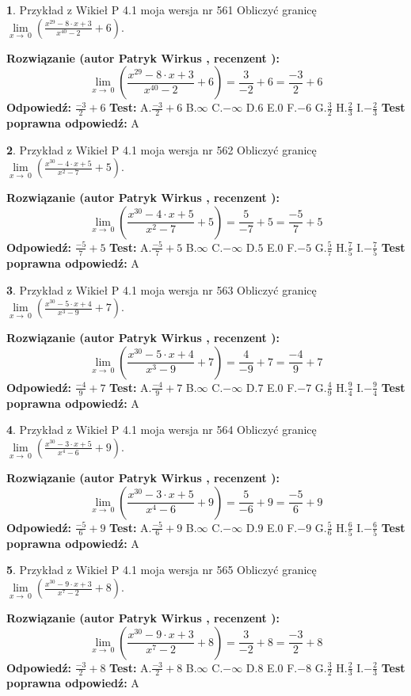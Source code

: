 \documentclass[12pt, a4paper]{article}
\theoremstyle{definition} %
\newtheorem{zad}{}
\newcommand{\zadStart}[1]{\begin{zad}#1\newline}
\newcommand{\zadStop}{\end{zad}}
\newcommand{\rozwStart}[2]{\noindent \textbf{Rozwiązanie (autor #1 , recenzent #2): }\newline}
\newcommand{\rozwStop}{\newline}
\newcommand{\odpStart}{\noindent \textbf{Odpowiedź:}\newline}
\newcommand{\odpStop}{\newline}
\newcommand{\testStart}{\noindent \textbf{Test:}\newline}
\newcommand{\testStop}{\newline}
\newcommand{\kluczStart}{\noindent \textbf{Test poprawna odpowiedź:}\newline}
\newcommand{\kluczStop}{\newline}
\begin{document}
\zadStart{Przykład z Wikieł P 4.1 moja wersja nr 561}
Obliczyć granicę $\lim\limits_{x\to\ 0}(\frac{x^{29}-8 \cdot x +3}{x^{40}-2}+6)$.
\zadStop
\rozwStart{Patryk Wirkus}{}
$$\lim\limits_{x\to\ 0}(\frac{x^{29}-8 \cdot x +3}{x^{40}-2}+6)=\frac{3}{-2}+6=\frac{-3}{2}+6$$
\rozwStop
\odpStart
$\frac{-3}{2}+6$
\odpStop
\testStart
A.$\frac{-3}{2}+6$
B.$\infty$
C.$-\infty$
D.$6$
E.$0$
F.$-6$
G.$\frac{3}{2}$
H.$\frac{2}{3}$
I.$-\frac{2}{3}$
\testStop
\kluczStart
A
\kluczStop



\zadStart{Przykład z Wikieł P 4.1 moja wersja nr 562}
Obliczyć granicę $\lim\limits_{x\to\ 0}(\frac{x^{30}-4 \cdot x +5}{x^{2}-7}+5)$.
\zadStop
\rozwStart{Patryk Wirkus}{}
$$\lim\limits_{x\to\ 0}(\frac{x^{30}-4 \cdot x +5}{x^{2}-7}+5)=\frac{5}{-7}+5=\frac{-5}{7}+5$$
\rozwStop
\odpStart
$\frac{-5}{7}+5$
\odpStop
\testStart
A.$\frac{-5}{7}+5$
B.$\infty$
C.$-\infty$
D.$5$
E.$0$
F.$-5$
G.$\frac{5}{7}$
H.$\frac{7}{5}$
I.$-\frac{7}{5}$
\testStop
\kluczStart
A
\kluczStop



\zadStart{Przykład z Wikieł P 4.1 moja wersja nr 563}
Obliczyć granicę $\lim\limits_{x\to\ 0}(\frac{x^{30}-5 \cdot x +4}{x^{3}-9}+7)$.
\zadStop
\rozwStart{Patryk Wirkus}{}
$$\lim\limits_{x\to\ 0}(\frac{x^{30}-5 \cdot x +4}{x^{3}-9}+7)=\frac{4}{-9}+7=\frac{-4}{9}+7$$
\rozwStop
\odpStart
$\frac{-4}{9}+7$
\odpStop
\testStart
A.$\frac{-4}{9}+7$
B.$\infty$
C.$-\infty$
D.$7$
E.$0$
F.$-7$
G.$\frac{4}{9}$
H.$\frac{9}{4}$
I.$-\frac{9}{4}$
\testStop
\kluczStart
A
\kluczStop



\zadStart{Przykład z Wikieł P 4.1 moja wersja nr 564}
Obliczyć granicę $\lim\limits_{x\to\ 0}(\frac{x^{30}-3 \cdot x +5}{x^{4}-6}+9)$.
\zadStop
\rozwStart{Patryk Wirkus}{}
$$\lim\limits_{x\to\ 0}(\frac{x^{30}-3 \cdot x +5}{x^{4}-6}+9)=\frac{5}{-6}+9=\frac{-5}{6}+9$$
\rozwStop
\odpStart
$\frac{-5}{6}+9$
\odpStop
\testStart
A.$\frac{-5}{6}+9$
B.$\infty$
C.$-\infty$
D.$9$
E.$0$
F.$-9$
G.$\frac{5}{6}$
H.$\frac{6}{5}$
I.$-\frac{6}{5}$
\testStop
\kluczStart
A
\kluczStop



\zadStart{Przykład z Wikieł P 4.1 moja wersja nr 565}
Obliczyć granicę $\lim\limits_{x\to\ 0}(\frac{x^{30}-9 \cdot x +3}{x^{7}-2}+8)$.
\zadStop
\rozwStart{Patryk Wirkus}{}
$$\lim\limits_{x\to\ 0}(\frac{x^{30}-9 \cdot x +3}{x^{7}-2}+8)=\frac{3}{-2}+8=\frac{-3}{2}+8$$
\rozwStop
\odpStart
$\frac{-3}{2}+8$
\odpStop
\testStart
A.$\frac{-3}{2}+8$
B.$\infty$
C.$-\infty$
D.$8$
E.$0$
F.$-8$
G.$\frac{3}{2}$
H.$\frac{2}{3}$
I.$-\frac{2}{3}$
\testStop
\kluczStart
A
\kluczStop
\end{document}
